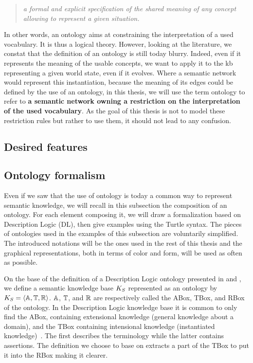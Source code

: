 \begin{quote} 
\centering 
\textit{a formal and explicit specification of the shared meaning of any concept allowing to represent a given situation.}
\end{quote}

In other words, an ontology aims at constraining the interpretation of a used vocabulary. It is thus a logical theory. However, looking at the literature, we constat that the definition of an ontology is still today blurry. Indeed, even if it represents the meaning of the usable concepts, we want to apply it to the \acrshort{kb} representing a given world state, even if it evolves. Where a semantic network would represent this instantiation, because the meaning of its edges could be defined by the use of an ontology, in this thesis, we will use the term ontology to refer to \textbf{a semantic network owning a restriction on the interpretation of the used vocabulary}. As the goal of this thesis is not to model these restriction rules but rather to use them, it should not lead to any confusion.


\subsection{Desired features}

\subsection{Ontology formalism}
\label{sec:kb_formalism}

Even if we saw that the use of ontology is today a common way to represent semantic knowledge, we will recall in this subsection the composition of an ontology. For each element composing it, we will draw a formalization based on Description Logic (DL), then give examples using the Turtle syntax. The pieces of ontologies used in the examples of this subsection are voluntarily simplified. The introduced notations will be the ones used in the rest of this thesis and the graphical representations, both in terms of color and form, will be used as often as possible.

On the base of the definition of a Description Logic ontology presented in \cite{fokoue_2006_summary} and \cite{krotzsch_2013_description}, we define a semantic knowledge base $K_S$ represented as an ontology by  $K_S = \langle \mathbb{A}, \mathbb{T}, \mathbb{R} \rangle$. $\mathbb{A}$, $\mathbb{T}$, and $\mathbb{R}$ are respectively called the ABox, TBox, and RBox of the ontology. In the Description Logic knowledge base it is common to only find the ABox, containing extensional knowledge (general knowledge about a domain), and the TBox containing intensional knowledge (instantiated knowledge)~\cite{baader_2003_description}. The first describes the terminology while the latter contains assertions. The definition we choose to base on extracts a part of the TBox to put it into the RBox making it clearer.

